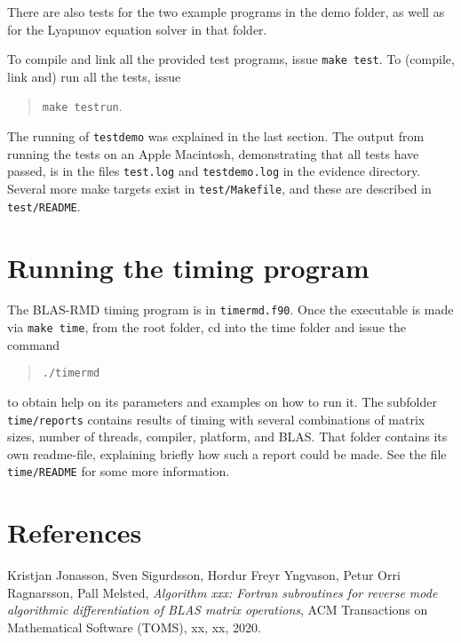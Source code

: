 \documentclass[a4paper]{article}
\begin{document}
There are also tests for the two example programs in the demo folder, as well as
for the Lyapunov equation solver in that folder.

To compile and link all the provided test programs, issue \texttt{make test}. To
(compile, link and) run all the tests, issue

\begin{quote}
\texttt{make testrun}.
\end{quote}

\noindent
The running of \texttt{testdemo} was explained in the last section. The output
from running the tests on an Apple Macintosh, demonstrating that all tests have
passed, is in the files \texttt{test.log} and \texttt{testdemo.log} in the
evidence directory. Several more make targets exist in \texttt{test/Makefile},
and these are described in \texttt{test/README}.

\section{Running the timing program}
The BLAS-RMD timing program is in \texttt{timermd.f90}. Once the executable is
made via \texttt{make time}, from the root folder, cd into the time folder and
issue the command

\begin{quote}
  \texttt{./timermd}
\end{quote}
  
\noindent
to obtain help on its parameters and examples on how to run it. The subfolder
\texttt{time/reports} contains results of timing with several combinations of
matrix sizes, number of threads, compiler, platform, and BLAS. That folder
contains its own readme-file, explaining briefly how such a report
could be made. See the file \texttt{time/README} for some more information.

\section{References}
\begin{hangparas}{1.4em}{1}
\noindent [1] Kristjan Jonasson, Sven Sigurdsson, Hordur Freyr Yngvason, Petur
Orri Ragnarsson, Pall Melsted, {\it Algorithm xxx: Fortran subroutines for
  reverse mode algorithmic differentiation of BLAS matrix operations}, ACM
Transactions on Mathematical Software (TOMS), xx, xx, 2020.


\end{hangparas}
\end{document}
